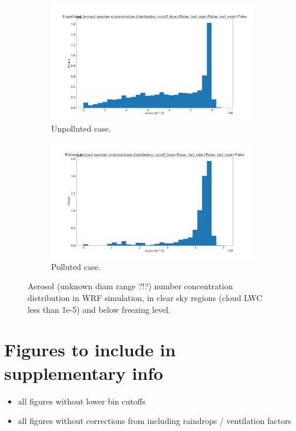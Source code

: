 \documentclass{article}
\begin{document}
\begin{figure}[ht]
	\centering
	\begin{subfigure}{0.7\textwidth}
		\includegraphics[width=\textwidth]{revmywrf/v1_aero_nconc_hist_Unpolluted_figure.png}
		\caption{Unpolluted case.}
		\label{wrfaeronconchistunpoll}
	\end{subfigure}
	\begin{subfigure}{0.7\textwidth}
		\includegraphics[width=\textwidth]{revmywrf/v1_aero_nconc_hist_Polluted_figure.png}
		\caption{Polluted case.}
		\label{wrfaeronconchistpoll}
	\end{subfigure}
	\caption{Aerosol (unknown diam range ?!?) number concentration distribution in WRF simulation, in clear sky regions (cloud LWC less than 1e-5) and below freezing level.}
	\label{wrfaeronconchist}
\end{figure}

\clearpage
\newpage

\section{Figures to include in supplementary info}
\begin{itemize}
	\item all figures without lower bin cutoffs
	\item all figures without corrections from including raindrops / ventilation factors
\end{itemize}
\end{document}
